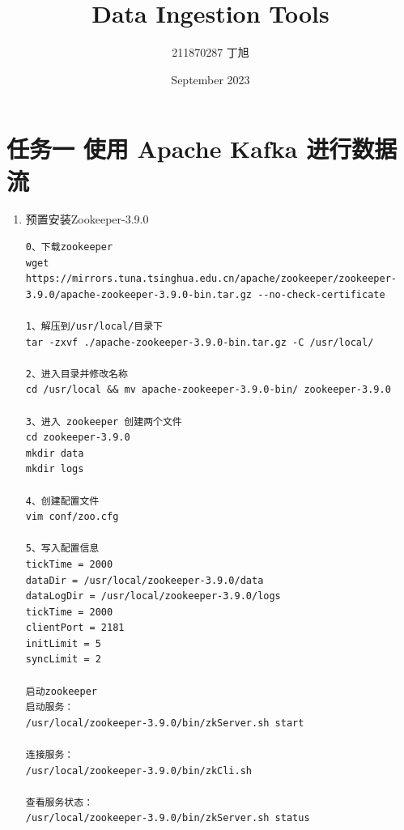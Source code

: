 \documentclass{article}
\title{Data Ingestion Tools}
\author{211870287 丁旭 }
\date{September 2023}
\begin{document}
\maketitle

\section{任务一 使用 Apache Kafka 进行数据流}
\begin{enumerate}
    \item 预置安装Zookeeper-3.9.0
    \begin{lstlisting}
0、下载zookeeper
wget https://mirrors.tuna.tsinghua.edu.cn/apache/zookeeper/zookeeper-3.9.0/apache-zookeeper-3.9.0-bin.tar.gz --no-check-certificate

1、解压到/usr/local/目录下
tar -zxvf ./apache-zookeeper-3.9.0-bin.tar.gz -C /usr/local/

2、进入目录并修改名称
cd /usr/local && mv apache-zookeeper-3.9.0-bin/ zookeeper-3.9.0

3、进入 zookeeper 创建两个文件
cd zookeeper-3.9.0
mkdir data 
mkdir logs

4、创建配置文件
vim conf/zoo.cfg

5、写入配置信息
tickTime = 2000
dataDir = /usr/local/zookeeper-3.9.0/data
dataLogDir = /usr/local/zookeeper-3.9.0/logs
tickTime = 2000
clientPort = 2181
initLimit = 5
syncLimit = 2

启动zookeeper
启动服务：
/usr/local/zookeeper-3.9.0/bin/zkServer.sh start

连接服务：
/usr/local/zookeeper-3.9.0/bin/zkCli.sh

查看服务状态：
/usr/local/zookeeper-3.9.0/bin/zkServer.sh status


\end{lstlisting}
\end{enumerate}
\end{document}
